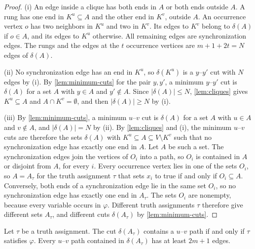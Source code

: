 \begin{proof}
(i) An edge inside a clique has both ends in $A$ or both ends outside $A$.
A rung has one end in $K^u \subseteq A$ and the other end in $K^v$, outside $A$.
An occurrence vertex $o$ has two neighbors in $K^u$ and two in $K^v$.
Its edges to $K^v$ belong to $\delta(A)$ if $o \in A$, and its edges to $K^u$ otherwise.
All remaining edges are synchronization edges.
The rungs and the edges at the $t$ occurrence vertices are $m + 1 + 2t = N$ edges of $\delta(A)$.

(ii) No synchronization edge has an end in $K^u$, so $\delta(K^u)$ is a $y$--$y'$ cut with $N$ edges by (i).
By \cref{lem:minimum-cuts} for the pair $y, y'$, a minimum $y$--$y'$ cut is $\delta(A)$ for a set $A$ with $y \in A$ and $y' \notin A$.
Since $|\delta(A)| \leq N$, \cref{lem:cliques} gives $K^u \subseteq A$ and $A \cap K^v = \emptyset$, and then $|\delta(A)| \geq N$ by (i).

(iii) By \cref{lem:minimum-cuts}, a minimum $u$--$v$ cut is $\delta(A)$ for a set $A$ with $u \in A$ and $v \notin A$, and $|\delta(A)| = N$ by (ii).
By \cref{lem:cliques} and (i), the minimum $u$--$v$ cuts are therefore the sets $\delta(A)$ with $K^u \subseteq A \subseteq V \setminus K^v$ such that no synchronization edge has exactly one end in $A$.
Let $A$ be such a set.
The synchronization edges join the vertices of $O_i$ into a path, so $O_i$ is contained in $A$ or disjoint from $A$, for every $i$.
Every occurrence vertex lies in one of the sets $O_i$, so $A = A_\tau$ for the truth assignment $\tau$ that sets $x_i$ to true if and only if $O_i \subseteq A$.
Conversely, both ends of a synchronization edge lie in the same set $O_i$, so no synchronization edge has exactly one end in $A_\tau$.
The sets $O_i$ are nonempty, because every variable occurs in $\varphi$.
Different truth assignments $\tau$ therefore give different sets $A_\tau$, and different cuts $\delta(A_\tau)$ by \cref{lem:minimum-cuts}.
\end{proof}

\begin{lemma}
\label{lem:satisfying}
Let $\tau$ be a truth assignment.
The cut $\delta(A_\tau)$ contains a $u$--$v$ path if and only if $\tau$ satisfies $\varphi$.
Every $u$--$v$ path contained in $\delta(A_\tau)$ has at least $2m + 1$ edges.
\end{lemma}

